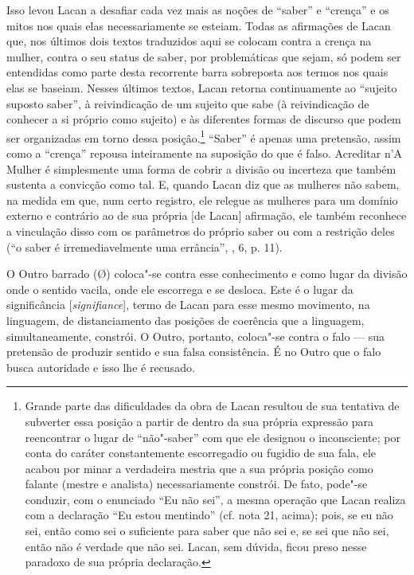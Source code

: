 Isso levou Lacan a desafiar cada vez mais as noções de ``saber'' e
``crença'' e os mitos nos quais elas necessariamente se esteiam. Todas
as afirmações de Lacan que, nos últimos dois textos traduzidos aqui
se colocam contra a crença na mulher, contra o seu status de saber, por
problemáticas que sejam, só podem ser entendidas como parte desta
recorrente barra sobreposta aos termos nos quais elas se baseiam. Nesses
últimos textos, Lacan retorna continuamente ao ``sujeito suposto
saber'', à reivindicação de um sujeito que sabe (à reivindicação de
conhecer a si próprio como sujeito) e às diferentes formas de discurso
que podem ser organizadas em torno dessa posição.\footnote{Grande parte
  das dificuldades da obra de Lacan resultou de sua tentativa de
  subverter essa posição a partir de dentro da sua própria expressão
  para reencontrar o lugar de ``não"-saber'' com que ele designou o
  inconsciente; por conta do caráter constantemente escorregadio ou
  fugidio de sua fala, ele acabou por minar a verdadeira mestria que a
  sua própria posição como falante (mestre e analista) necessariamente
  constrói. De fato, pode"-se conduzir, com o enunciado ``Eu não sei'', a
  mesma operação que Lacan realiza com a declaração ``Eu estou
  mentindo'' (cf. nota 21, acima); pois, se eu não sei, então como sei o
  suficiente para saber que não sei e, se sei que não sei, então não é
  verdade que não sei. Lacan, sem dúvida, ficou preso nesse paradoxo de
  sua própria declaração.} ``Saber'' é apenas uma pretensão, assim como
a ``crença'' repousa inteiramente na suposição do que é falso. Acreditar
n'A Mulher é simplesmente uma forma de cobrir a divisão ou incerteza que
também sustenta a convicção como tal. E, quando Lacan diz que as
mulheres não sabem, na medida em que, num certo registro, ele relegue as
mulheres para um domínio externo e contrário ao de sua própria {[}de
Lacan{]} afirmação, ele também reconhece a vinculação disso com os
parâmetros do próprio saber ou com a restrição deles (``o saber é
irremediavelmente uma errância'', , 6, p. 11). %

O Outro barrado (Ø) coloca"-se contra esse conhecimento e como lugar da
divisão onde o sentido vacila, onde ele escorrega e se desloca. Este é o
lugar da significância {[}\emph{signifiance}{]}, termo de Lacan para
esse mesmo movimento, na linguagem, de distanciamento das posições de
coerência que a linguagem, simultaneamente, constrói. O Outro, portanto,
coloca"-se contra o falo --- sua pretensão de produzir sentido e sua falsa
consistência. É no Outro que o falo busca autoridade e isso lhe é
recusado.

